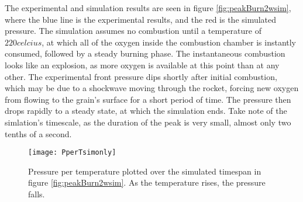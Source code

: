The experimental and simulation results are seen in figure \ref{fig:peakBurn2wsim}, where the blue line is the experimental results, and the red is the simulated pressure. The simulation assumes no combustion until a temperature of $\si{220}{celcius}$, at which all of the oxygen inside the combustion chamber is instantly consumed, followed by a steady burning phase. The instantaneous combustion looks like an explosion, as more oxygen is available at this point than at any other. The experimental front pressure dips shortly after initial combustion, which may be due to a shockwave moving through the rocket, forcing new oxygen from flowing to the grain's surface for a short period of time. The pressure then drops rapidly to a steady state, at which the simulation ends. Take note of the simlation's timescale, as the duration of the peak is very small, almost only two tenths of a second.


\begin{figure}
	\centering
	\texttt{[image: PperTsimonly]}
	\caption{Pressure per temperature plotted over the simulated timespan in figure \ref{fig:peakBurn2wsim}. As the temperature rises, the pressure falls.}
	\label{fig:pressurepertemp}
\end{figure}
